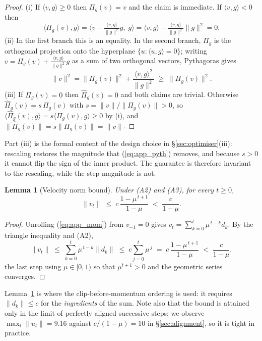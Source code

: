 \documentclass{article}
\newtheorem{lemma}{Lemma}
\theoremstyle{remark}
\theoremstyle{plain}
\begin{document}
\begin{proof}
(i) If $\langle v,g\rangle \ge 0$ then $\Pi_g(v)=v$ and the claim is immediate.
If $\langle v,g\rangle<0$ then
\[
\langle \Pi_g(v), g\rangle
= \Big\langle v - \tfrac{\langle v,g\rangle}{\|g\|^2}g,\; g\Big\rangle
= \langle v,g\rangle - \tfrac{\langle v,g\rangle}{\|g\|^2}\|g\|^2 = 0 .
\]
(ii) In the first branch this is an equality. In the second branch, $\Pi_g$ is
the orthogonal projection onto the hyperplane $\{u:\langle u,g\rangle=0\}$;
writing $v = \Pi_g(v) + \tfrac{\langle v,g\rangle}{\|g\|^2}g$ as a sum of two
orthogonal vectors, Pythagoras gives
\begin{equation}\label{eq:app_pyth}
\|v\|^2 = \|\Pi_g(v)\|^2 + \frac{\langle v,g\rangle^2}{\|g\|^2}
\;\ge\; \|\Pi_g(v)\|^2 .
\end{equation}
(iii) If $\Pi_g(v)=0$ then $\widehat{\Pi}_g(v)=0$ and both claims are trivial.
Otherwise $\widehat{\Pi}_g(v) = s\,\Pi_g(v)$ with
$s = \|v\|/\|\Pi_g(v)\| > 0$, so
$\langle \widehat{\Pi}_g(v),g\rangle = s\langle \Pi_g(v),g\rangle \ge 0$ by (i),
and $\|\widehat{\Pi}_g(v)\| = s\|\Pi_g(v)\| = \|v\|$.
\end{proof}

Part (iii) is the formal content of the design choice in
\S\ref{sec:optimiser}(iii): rescaling restores the magnitude that
(\ref{eq:app_pyth}) removes, and because $s>0$ it cannot flip the sign of the
inner product. The guarantee is therefore invariant to the rescaling, while the
step magnitude is not.

\begin{lemma}[Velocity norm bound]\label{lem:vel}
Under (A2) and (A3), for every $t \ge 0$,
\begin{equation}\label{eq:app_velbound}
\|v_t\| \;\le\; c\,\frac{1-\mu^{\,t+1}}{1-\mu} \;<\; \frac{c}{1-\mu}.
\end{equation}
\end{lemma}

\begin{proof}
Unrolling (\ref{eq:app_mom}) from $v_{-1}=0$ gives
$v_t = \sum_{k=0}^{t}\mu^{\,t-k} d_k$. By the triangle inequality and (A2),
\[
\|v_t\| \;\le\; \sum_{k=0}^{t}\mu^{\,t-k}\|d_k\|
\;\le\; c\sum_{j=0}^{t}\mu^{\,j}
\;=\; c\,\frac{1-\mu^{\,t+1}}{1-\mu}
\;<\; \frac{c}{1-\mu},
\]
the last step using $\mu\in[0,1)$ so that $\mu^{t+1}>0$ and the geometric series
converges.
\end{proof}

Lemma~\ref{lem:vel} is where the clip-before-momentum ordering is used: it
requires $\|d_k\|\le c$ for the \emph{ingredients} of the sum. Note also that the
bound is attained only in the limit of perfectly aligned successive steps; we
observe $\max_t\|u_t\| = 9.16$ against $c/(1-\mu)=10$ in
\S\ref{sec:alignment}, so it is tight in practice.
\end{document}
